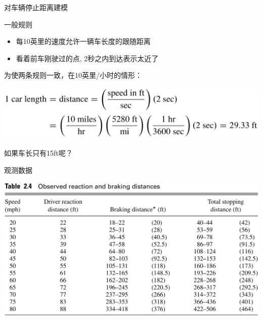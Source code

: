 \documentclass[UTF8]{ctexbeamer}
\begin{document}
\begin{frame}{对车辆停止距离建模}
  \begin{block}{一般规则}
    \begin{itemize}
    \item 每10英里的速度允许一辆车长度的跟随距离
    \item 看着前车刚驶过的点, 2秒之内到达表示太近了
    \end{itemize}
  \end{block}

  为使两条规则一致，在10英里/小时的情形：

  \begin{center}
    \includegraphics[width=.6\textwidth{}]{carformula.png}
  \end{center}

  如果车长只有15ft呢？

\end{frame}

\begin{frame}{观测数据}
  \begin{center}
    \includegraphics[width=.8\textwidth{}]{cardata.png}
  \end{center}
\end{frame}
\end{document}
